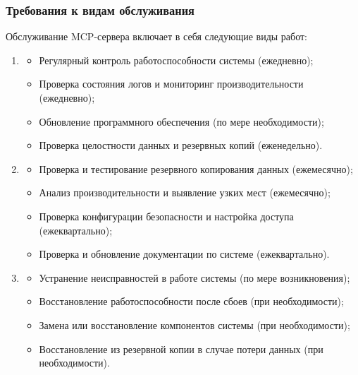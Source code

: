 \documentclass[utf8, russian]{eskdtext}
\begin{document}
\subsubsection{Требования к видам обслуживания}

Обслуживание MCP-сервера включает в себя следующие виды работ:

\begin{enumerate}
    \item {}
    \begin{itemize}
        \item Регулярный контроль работоспособности системы (ежедневно);
        \item Проверка состояния логов и мониторинг производительности (ежедневно);
        \item Обновление программного обеспечения (по мере необходимости);
        \item Проверка целостности данных и резервных копий (еженедельно).
    \end{itemize}
    
    \item {}
    \begin{itemize}
        \item Проверка и тестирование резервного копирования данных (ежемесячно);
        \item Анализ производительности и выявление узких мест (ежемесячно);
        \item Проверка конфигурации безопасности и настройка доступа (ежеквартально);
        \item Проверка и обновление документации по системе (ежеквартально).
    \end{itemize}
    
    \item {}
    \begin{itemize}
        \item Устранение неисправностей в работе системы (по мере возникновения);
        \item Восстановление работоспособности после сбоев (при необходимости);
        \item Замена или восстановление компонентов системы (при необходимости);
        \item Восстановление из резервной копии в случае потери данных (при необходимости).
    \end{itemize}
\end{enumerate}
\end{document}
